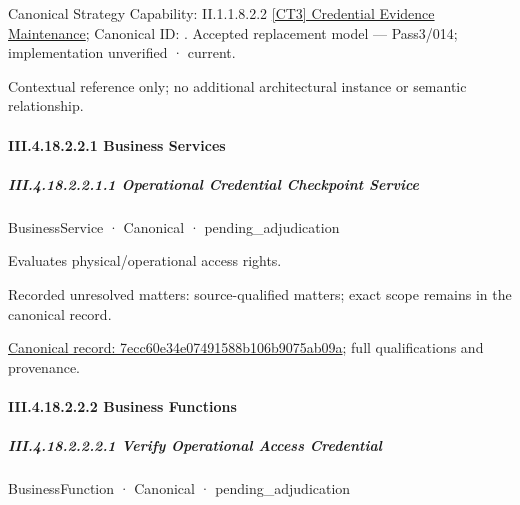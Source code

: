 {\small Canonical Strategy Capability: II.1.1.8.2.2 \hyperref[element:ece496e1dc7e4a319318ef6811dfece7]{[CT3] Credential Evidence Maintenance}; Canonical ID: \texttt{}. Accepted replacement model — Pass3/014; implementation unverified · current.}\par
Contextual reference only; no additional architectural instance or semantic relationship.\par
\paragraph*{III.4.18.2.2.1 Business Services}
\label{navigation:III.4.18.2.2.1}

\subparagraph*{III.4.18.2.2.1.1 Operational Credential Checkpoint Service}
\label{navigation:III.4.18.2.2.1.1}

\label{element:7ecc60e34e07491588b106b9075ab09a}
{\small BusinessService · Canonical · pending\_adjudication}\par

Evaluates physical/operational access rights.


{\small Recorded unresolved matters: source-qualified matters; exact scope remains in the canonical record.}\par
{\footnotesize \href{../../../../../../../continuum/business/business-service/7ecc60e34e07491588b106b9075ab09a.md}{Canonical record: 7ecc60e34e07491588b106b9075ab09a}; full qualifications and provenance.}\par
\paragraph*{III.4.18.2.2.2 Business Functions}
\label{navigation:III.4.18.2.2.2}

\subparagraph*{III.4.18.2.2.2.1 Verify Operational Access Credential}
\label{navigation:III.4.18.2.2.2.1}

\label{element:a0eb34a7cb7046fd880248e799632810}
{\small BusinessFunction · Canonical · pending\_adjudication}\par

